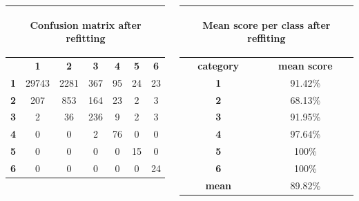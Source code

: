 \documentclass[c]{beamer}
\begin{document}
\begin{frame}
\begin{columns}
\begin{column}{0.7\textwidth}
  \begin{table}
  \begin{center}
  \begin{adjustbox}{max width=0.6\textwidth}
  {\tiny
  \begin{tabular}{|c|c|c|c|c|c|c|}
    \hline
    \multicolumn{7}{|c|}{{\tiny \begin{bf}Confusion matrix after refitting\end{bf}}} \\
    \hline
     & \textbf{1} & \textbf{2} & \textbf{3} & \textbf{4} & \textbf{5} & \textbf{6}\\
    \hline
    \textbf{1} & 29743 & 2281 & 367 & 95 & 24 & 23\\
    \hline
    \textbf{2} & 207 & 853 & 164 & 23 & 2 & 3\\
    \hline
    \textbf{3} & 2 & 36 & 236 & 9 & 2 & 3\\
    \hline
    \textbf{4} & 0 & 0 & 2 & 76 & 0 & 0\\
    \hline
    \textbf{5} & 0 & 0 & 0 & 0 & 15 & 0\\
    \hline
    \textbf{6} & 0 & 0 & 0 & 0 & 0 & 24\\
    \hline
  \end{tabular}
  }
  \end{adjustbox}
  \end{center}
  \end{table}
\end{column}
\begin{column}{0.5\textwidth}
   \begin{table}
    \begin{center}
    \begin{adjustbox}{max width=0.5\textwidth}
    {\tiny 
    \begin{tabular}{|c|c|}
      \hline
      \multicolumn{2}{|c|}{\begin{bf}Mean score per class after reffiting\end{bf}} \\
      \hline
      \textbf{category} & \textbf{mean score}\\
      \hline
      \textbf{1} & 91.42\% \\
      \hline
      \textbf{2} & 68.13\% \\
      \hline
      \textbf{3} & 91.95\% \\
      \hline
      \textbf{4} & 97.64\% \\
      \hline
      \textbf{5} & 100\% \\
      \hline
      \textbf{6} & 100\% \\
      \hline
      \textbf{mean} & 89.82\% \\
      \hline
    \end{tabular}
    }
    \end{adjustbox}
    \end{center}
  \end{table}
\end{column}
\end{columns}
\end{frame}
\end{document}
